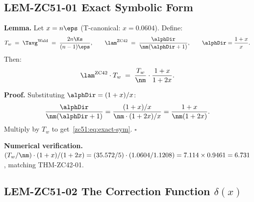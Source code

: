 \documentclass[12pt, a4paper]{article}
\begin{document}
\subsection{LEM-ZC51-01 \quad Exact Symbolic Form}


\begin{formalbox}[title={LEM-ZC51-01: Exact Symbolic Form
  $\lam^{\rm ZC42}\cdot\Tavg^{\rm Wald} = (T_w/\nm)\cdot(1+x)/(1+2x)$}]
\textbf{Lemma.}
Let $x = n\eps$ (T-canonical: $x = 0.0604$). Define:
\[
  T_w \;=\; \Tavg^{\rm Wald} \;=\; \frac{2n\Ks}{(n-1)\eps},
  \qquad
  \lam^{\rm ZC42} \;=\; \frac{\alphDir}{\nm(\alphDir+1)},
  \qquad \alphDir = \frac{1+x}{x}.
\]
Then:
\begin{equation}\label{zc51:eq:exact-sym}
  \lam^{\rm ZC42}\cdot T_w
  \;=\; \frac{T_w}{\nm}\cdot\frac{1+x}{1+2x}.
\end{equation}

\textbf{Proof.}
Substituting $\alphDir = (1+x)/x$:
\[
  \frac{\alphDir}{\nm(\alphDir+1)}
  = \frac{(1+x)/x}{\nm\cdot(1+2x)/x}
  = \frac{1+x}{\nm(1+2x)}.
\]
Multiply by $T_w$ to get~\eqref{zc51:eq:exact-sym}. \hfill$\square$

\textbf{Numerical verification.}
$(T_w/\nm)\cdot(1+x)/(1+2x)
= (35.572/5)\cdot(1.0604/1.1208)
= 7.114\times 0.9461
= 6.731$, matching THM-ZC42-01.
\end{formalbox}

\subsection{LEM-ZC51-02 \quad The Correction Function $\delta(x)$}

\end{document}
